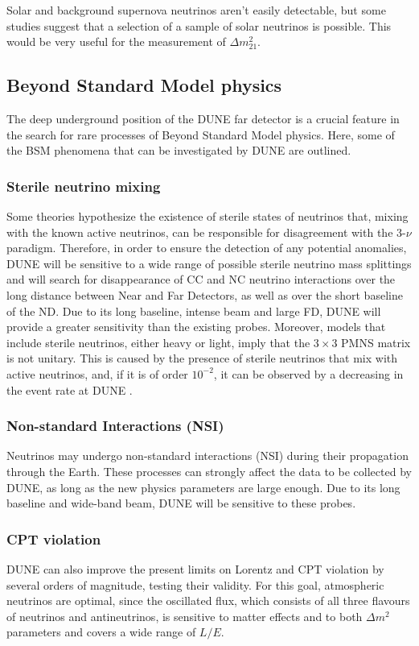 Solar and background supernova neutrinos aren't easily detectable, but some studies suggest that a selection of a sample of solar neutrinos is possible. This would be very useful for the measurement of $\Delta m^2_{21}$.

\subsection{Beyond Standard Model physics}
The deep underground position of the DUNE far detector is a crucial feature in the search for rare processes of Beyond Standard Model physics. Here, some of the BSM phenomena that can be investigated by DUNE are outlined.

\subsubsection{Sterile neutrino mixing}
Some theories hypothesize the existence of sterile states of neutrinos that, mixing with the known active neutrinos, can be responsible for disagreement with the 3-$\nu$ paradigm. Therefore, in order to ensure the detection of any potential anomalies, DUNE will be sensitive to a wide range of possible sterile neutrino mass splittings and will search for  disappearance of CC and NC neutrino interactions over the long distance between Near and Far Detectors, as well as over the short baseline of the ND. Due to its long baseline, intense beam and large FD, DUNE will provide a greater sensitivity than the existing probes.
Moreover, models that include sterile neutrinos, either heavy or light, imply that the $3 \times 3$ PMNS matrix is not unitary. This is caused by the presence of sterile neutrinos that mix with active neutrinos, and, if it is of order $10^{-2}$, it can be observed by a decreasing in the event rate at DUNE \cite{fd_tdr_vol2}.

\subsubsection{Non-standard Interactions (NSI)}
Neutrinos may undergo non-standard interactions (NSI) during their propagation through the Earth. These processes can strongly affect the data to be collected by DUNE, as long as the new physics parameters are large enough. Due to its long baseline and wide-band beam, DUNE will be sensitive to these probes.

\subsubsection{CPT violation}
DUNE can also improve the present limits on Lorentz and CPT violation by several orders of magnitude, testing their validity. For this goal, atmospheric neutrinos are optimal, since the oscillated flux, which consists of all three flavours of neutrinos and antineutrinos, is sensitive to matter effects and to both $\Delta m^2$ parameters and covers a wide range of $L/E$.

